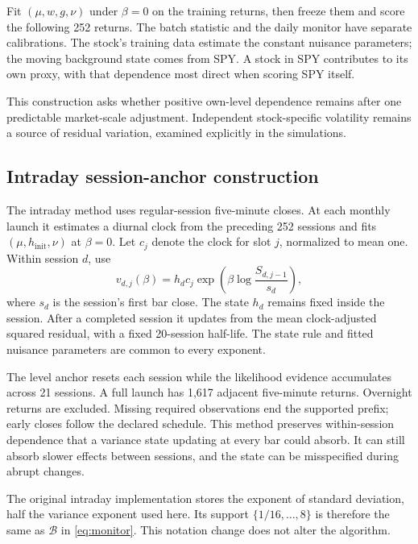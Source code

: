 Fit $(\mu,w,g,\nu)$ under $\beta=0$ on the training returns, then freeze
them and score the following 252 returns. The batch statistic and the daily
monitor have separate calibrations. The stock's training data estimate the constant nuisance parameters; the
moving background state comes from SPY. A stock in SPY contributes to
its own proxy, with that dependence most direct when scoring SPY itself.

This construction asks whether positive own-level dependence remains after
one predictable market-scale adjustment. Independent stock-specific
volatility remains a source of residual variation, examined explicitly in
the simulations.

\subsection{Intraday session-anchor construction}\label{sec:intradayconstruction}
The intraday method uses regular-session five-minute closes. At each monthly
launch it estimates a diurnal clock from the preceding 252 sessions and
fits $(\mu,h_{\mathrm{init}},\nu)$ at $\beta=0$. Let $c_j$ denote the clock
for slot $j$, normalized to mean one. Within session $d$, use
\begin{equation}\label{eq:intradayscale}
 v_{d,j}(\beta)=h_d c_j
       \exp\!\left(\beta\log\frac{S_{d,j-1}}{s_d}\right),
\end{equation}
where $s_d$ is the session's first bar close. The state $h_d$ remains fixed
inside the session. After a completed session it updates from the mean
clock-adjusted squared residual, with a fixed 20-session half-life. The state
rule and fitted nuisance parameters are common to every exponent.

The level anchor resets each session while the likelihood evidence
accumulates across 21 sessions. A full launch has 1,617 adjacent five-minute
returns. Overnight returns are excluded. Missing required observations end
the supported prefix; early closes follow the declared schedule. This method
preserves within-session dependence that a variance state updating at every
bar could absorb. It can still absorb slower effects between sessions, and
the state can be misspecified during abrupt changes.

The original intraday implementation stores the exponent of standard
deviation, half the variance exponent used here. Its support
$\{1/16,\ldots,8\}$ is therefore the same as $\mathcal B$ in
\eqref{eq:monitor}. This notation change does not alter the algorithm.

